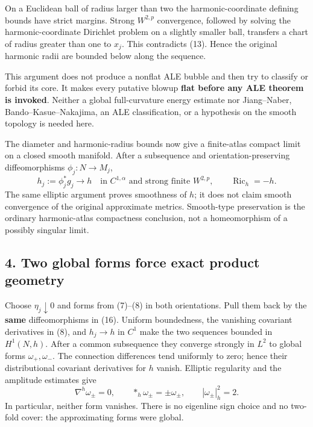 \documentclass[
  11pt,
]{article}
\begin{document}
On a Euclidean ball of radius larger than two the harmonic-coordinate
defining bounds have strict margins. Strong \(W^{2,p}\) convergence,
followed by solving the harmonic-coordinate Dirichlet problem on a
slightly smaller ball, transfers a chart of radius greater than one to
\(x_j\). This contradicts (13). Hence the original harmonic radii are
bounded below along the sequence.

This argument does not produce a nonflat ALE bubble and then try to
classify or forbid its core. It makes every putative blowup \textbf{flat
before any ALE theorem is invoked}. Neither a global full-curvature
energy estimate nor Jiang--Naber, Bando--Kasue--Nakajima, an ALE
classification, or a hypothesis on the smooth topology is needed here.

The diameter and harmonic-radius bounds now give a finite-atlas compact
limit on a closed smooth manifold. After a subsequence and
orientation-preserving diffeomorphisms \(\phi_j:N\to M_j\), \[
 h_j:=\phi_j^*g_j\longrightarrow h
 \quad\text{in }C^{1,\alpha}\text{ and strong finite }W^{2,p},
 \qquad\operatorname{Ric}_h=-h.
 \tag{16}
\] The same elliptic argument proves smoothness of \(h\); it does not
claim smooth convergence of the original approximate metrics.
Smooth-type preservation is the ordinary harmonic-atlas compactness
conclusion, not a homeomorphism of a possibly singular limit.

\hypertarget{two-global-forms-force-exact-product-geometry}{%
\subsection{4. Two global forms force exact product
geometry}\label{two-global-forms-force-exact-product-geometry}}

Choose \(\eta_j\downarrow0\) and forms from (7)--(8) in both
orientations. Pull them back by the \textbf{same} diffeomorphisms in
(16). Uniform boundedness, the vanishing covariant derivatives in (8),
and \(h_j\to h\) in \(C^1\) make the two sequences bounded in
\(H^1(N,h)\). After a common subsequence they converge strongly in
\(L^2\) to global forms \(\omega_+,\omega_-\). The connection
differences tend uniformly to zero; hence their distributional covariant
derivatives for \(h\) vanish. Elliptic regularity and the amplitude
estimates give \[
 \nabla^h\omega_\pm=0,
 \qquad *_h\omega_\pm=\pm\omega_\pm,
 \qquad|\omega_\pm|_h^2=2.
 \tag{17}
\] In particular, neither form vanishes. There is no eigenline sign
choice and no two-fold cover: the approximating forms were global.
\end{document}
